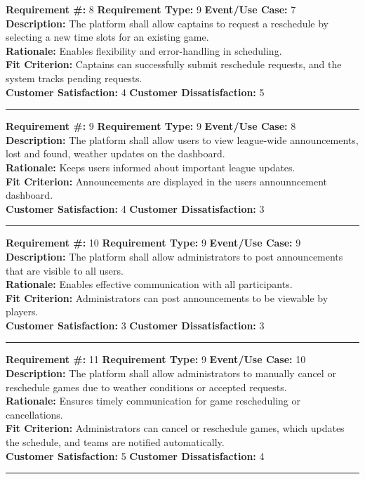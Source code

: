 \documentclass[12pt]{article}
\begin{document}
\textbf{Requirement \#:} 8 \quad \textbf{Requirement Type:} 9 \quad \textbf{Event/Use Case:} 7 \\
\textbf{Description:} The platform shall allow captains to request a reschedule by selecting a new time slots for an existing game.\\
\textbf{Rationale:} Enables flexibility and error-handling in scheduling.\\
\textbf{Fit Criterion:} Captains can successfully submit reschedule requests, and the system tracks pending requests.\\
\textbf{Customer Satisfaction:} 4 \quad\quad \textbf{Customer Dissatisfaction:} 5\\
\noindent\rule{\textwidth}{1pt}

\textbf{Requirement \#:} 9 \quad \textbf{Requirement Type:} 9 \quad \textbf{Event/Use Case:} 8 \\
\textbf{Description:} The platform shall allow users to view league-wide announcements, lost and found, weather updates on the dashboard.\\
\textbf{Rationale:} Keeps users informed about important league updates. \\
\textbf{Fit Criterion:} Announcements are displayed in the users announncement dashboard.\\
\textbf{Customer Satisfaction:} 4 \quad\quad \textbf{Customer Dissatisfaction:} 3\\
\noindent\rule{\textwidth}{1pt}

\textbf{Requirement \#:} 10 \quad \textbf{Requirement Type:} 9 \quad \textbf{Event/Use Case:} 9 \\
\textbf{Description:} The platform shall allow administrators to post announcements that are visible to all users.\\
\textbf{Rationale:} Enables effective communication with all participants.\\
\textbf{Fit Criterion:} Administrators can post announcements to be viewable by players.\\
\textbf{Customer Satisfaction:} 3 \quad\quad \textbf{Customer Dissatisfaction:} 3\\
\noindent\rule{\textwidth}{1pt}

\textbf{Requirement \#:} 11 \quad \textbf{Requirement Type:} 9 \quad \textbf{Event/Use Case:} 10 \\
\textbf{Description:} The platform shall allow administrators to manually cancel or reschedule games due to weather conditions or accepted requests.\\
\textbf{Rationale:} Ensures timely communication for game rescheduling or cancellations.\\
\textbf{Fit Criterion:} Administrators can cancel or reschedule games, which updates the schedule, and teams are notified automatically. \\
\textbf{Customer Satisfaction:} 5 \quad\quad \textbf{Customer Dissatisfaction:} 4\\
\noindent\rule{\textwidth}{1pt}
\end{document}
